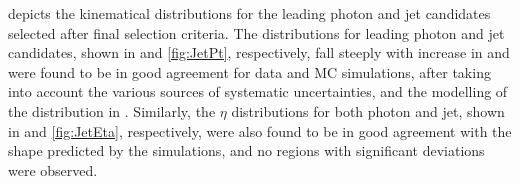 \Fig{\ref{fig:PtEta}} depicts the kinematical distributions for the leading photon and jet candidates selected after final selection criteria.
The \pt distributions for leading photon and jet candidates, shown in \fig{\ref{fig:PhotonPt}} and \ref{fig:JetPt}, respectively, fall steeply 
with increase in \pt and were found to be in good agreement for data and MC simulations, after taking into account the various sources of
systematic uncertainties, and the modelling of the \pt distribution in \pythia. Similarly, the $\eta$ distributions for both photon and jet,
shown in  \fig{\ref{fig:PhotonEta}} and \ref{fig:JetEta}, respectively, were also found to be in good agreement with the shape predicted by
the simulations, and no regions with significant deviations were observed.
\begin{figure}[h!]
\centering
   \\

\end{figure}
